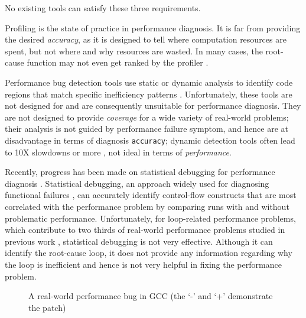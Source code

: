 No existing tools can satisfy these
three requirements.

Profiling is the state of practice in performance diagnosis.
It is far from providing the desired \textit{accuracy}, as it is designed to
tell where computation resources are spent, 
but not where and why resources are wasted. 
In many cases, the root-cause function may not even
get ranked by the profiler \cite{SongOOPSLA2014}.

Performance bug detection tools use static or dynamic analysis to identify
code regions that match specific inefficiency patterns 
\cite{Alabama,CARAMEL, Cachetor,Xu:2010:FLD:1806596.1806617,Dufour:2008:STC:1453101.1453111, Xu:2009:GFP:1542476.1542523, Xu:2010:DIC:1806596.1806616,IsilDillig.PLDI15}. 
Unfortunately, these tools are not designed for and are consequently
unsuitable for performance diagnosis.
They are not designed to provide \textit{coverage} for a wide
variety of real-world problems; their analysis is not guided by
performance failure symptom, and hence are at disadvantage in terms of diagnosis
\texttt{accuracy}; dynamic detection tools often lead to 
10X slowdowns or more \cite{Cachetor,Xu:2010:FLD:1806596.1806617,Alabama}, 
not ideal in terms of \textit{performance}.

Recently, progress has been made on statistical debugging for
performance diagnosis \cite{SongOOPSLA2014}.
Statistical debugging, an approach widely used for diagnosing
functional failures \cite{liblit03,liblit05,tarantula1}, can
accurately identify control-flow constructs that are most correlated with
the performance problem by comparing runs with and without problematic 
performance.
Unfortunately, for loop-related 
performance problems, which contribute to two thirds of
real-world performance problems studied in previous work 
\cite{SongOOPSLA2014,PerfBug}, statistical debugging is not very effective.
Although it can identify the root-cause loop, it does not provide any 
information regarding why the loop is inefficient and hence is not very helpful
in fixing the performance problem.

\begin{figure}
\centering
{}
  \mbox{}
\caption{A real-world performance bug in GCC (the `-' and `+' demonstrate the patch)}
\label{fig:GCC27733}
\end{figure}

